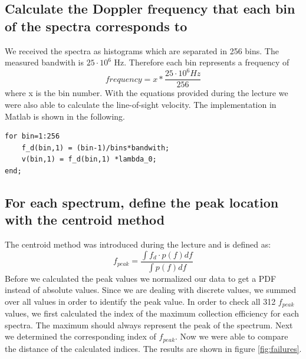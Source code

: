 \documentclass[10pt]{article}
\begin{document}
\subsection{Calculate the Doppler frequency that each bin of the spectra corresponds to}
We received the spectra as histograms which are separated in 256 bins. The measured bandwith is $25\cdot10^6 $ Hz. Therefore each bin represents a frequency of
\begin{equation*}
 frequency = x * \frac{25\cdot10^6 Hz}{256}
\end{equation*}
where x is the bin number.
With the equations provided during the lecture we were also able to calculate the line-of-sight velocity.
The implementation in Matlab is shown in the following.\\

\begin{lstlisting}
for bin=1:256
    f_d(bin,1) = (bin-1)/bins*bandwith;
    v(bin,1) = f_d(bin,1) *lambda_0;
end;
\end{lstlisting}

\subsection{For each spectrum, define the peak location with the centroid
method}
The centroid method was introduced during the lecture and is defined as:
\begin{equation*}
f_{peak} = \frac{\int f_d \cdot p(f) df}{\int p(f) df}
\end{equation*}
Before we calculated the peak values we normalized our data to get a PDF instead of absolute values.
Since we are dealing with discrete values, we summed over all values in order to identify the peak value. 
In order to check all 312 $f_{peak}$ values, we first calculated the index of the maximum collection efficiency for each spectra. The maximum should always represent the peak of the spectrum.
Next we determined the corresponding index of $f_{peak}$. Now we were able to compare the distance of the calculated indices. The results are shown in figure \ref{fig:failures}.
\end{document}
